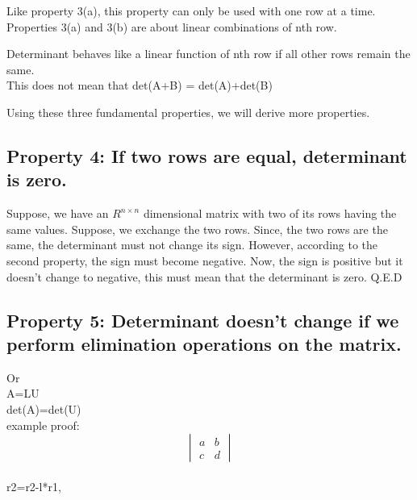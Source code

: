 \documentclass[]{article}
\begin{document}
Like property 3(a), this property can only be used with one row at a time.\\

\noindent
Properties 3(a) and 3(b) are about linear combinations of nth row.\\

\begin{mytheorem}
	Determinant behaves like a linear function of nth row if all other rows remain the same.\\
	
	This does not mean that det(A+B) = det(A)+det(B)
\end{mytheorem}

\noindent
Using these three fundamental properties, we will derive more properties.
\vspace{10pt}
\subsection{Property 4: If two rows are equal, determinant is zero.}

\vspace{10pt}

Suppose, we have an $R^{n \times n }$ dimensional matrix with two of its rows having the same values. Suppose, we exchange the two rows. Since, the two rows are the same, the determinant must not change its sign. However, according to the second property, the sign must become negative. Now, the sign is positive but it doesn't change to negative, this must mean that the determinant is zero.
Q.E.D
\vspace{10pt}
\subsection{Property 5: Determinant doesn't change if we perform elimination operations on the matrix.}

\vspace{10pt}

Or \\

\noindent
A=LU\\
det(A)=det(U)\\

\noindent
example proof:\\

\noindent
\[
\begin{vmatrix}
	a&b\\
	c&d
\end{vmatrix}
\]\\
r2=r2-l*r1,
\end{document}
